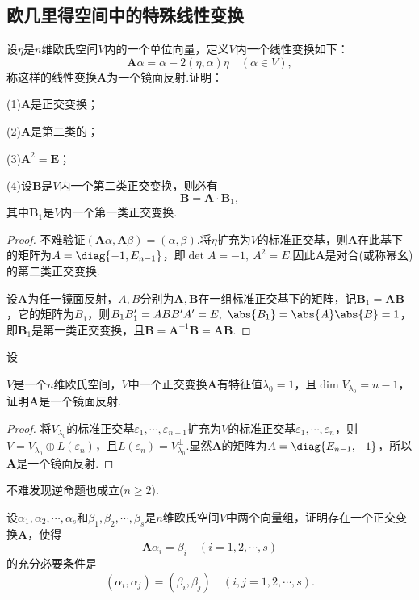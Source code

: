 \subsection{欧几里得空间中的特殊线性变换}
\begin{prob}[1]
	设$\eta$是$n$维欧氏空间$V$内的一个单位向量，定义$V$内一个线性变换如下：
	\[
		\bm A\alpha=\alpha-2(\eta,\alpha)\eta\quad(\alpha\in V),
	\]
	称这样的线性变换$\bm A$为一个{\heiti 镜面反射}.证明：

	(1)$\bm A$是正交变换；

	(2)$\bm A$是第二类的；

	(3)$\bm A^2=\bm E$；

	(4)设$\bm B$是$V$内一个第二类正交变换，则必有
	\[
		\bm B=\bm A\cdot \bm B_1,
	\]
	其中$\bm B_1$是$V$内一个第一类正交变换.
\end{prob}
\begin{proof}
	不难验证$(\bm A\alpha,\bm A\beta)=(\alpha,\beta)$.将$\eta$扩充为$V$的标准正交基，则$\bm A$在此基下的矩阵为$A=\diag{-1,E_{n-1}}$，即$\det A=-1,\ A^2=E$.因此$\bm A$是对合(或称幂幺)的第二类正交变换.

	设$\bm A$为任一镜面反射，$A,B$分别为$\bm A,\bm B$在一组标准正交基下的矩阵，记$\bm B_1=\bm A\bm B$，它的矩阵为$B_1$，则$B_1B_1'=ABB'A'=E,\ \abs{B_1}=\abs{A}\abs{B}=1$，即$\bm B_1$是第一类正交变换，且$\bm B=\bm A^{-1}\bm B=\bm A\bm B$.
\end{proof}
\begin{prob}[2]
	\hypertarget{Reflection}{设}$V$是一个$n$维欧氏空间，$V$中一个正交变换$\bm A$有特征值$\lambda_0=1$，且$\dim V_{\lambda_0}=n-1$，证明$\bm A$是一个镜面反射.
\end{prob}
\begin{proof}
	将$V_{\lambda_0}$的标准正交基$\varepsilon_1,\cdots,\varepsilon_{n-1}$扩充为$V$的标准正交基$\varepsilon_1,\cdots,\varepsilon_n$，则$V=V_{\lambda_0}\oplus L(\varepsilon_n)$，且$L(\varepsilon_n)=V_{\lambda_0}^\perp$.显然$\bm A$的矩阵为$A=\diag{E_{n-1},-1}$，所以$\bm A$是一个镜面反射.
\end{proof}
\begin{note}
	不难发现逆命题也成立($n\ge 2$).
\end{note}
\begin{prob}[3]
	设$\alpha_1,\alpha_2,\cdots,\alpha_s$和$\beta_1,\beta_2,\cdots,\beta_s$是$n$维欧氏空间$V$中两个向量组，证明存在一个正交变换$\bm A$，使得
	\[
		\bm A\alpha_i=\beta_i\quad(i=1,2,\cdots,s)
	\]
	的充分必要条件是
	\[
		(\alpha_i,\alpha_j)=(\beta_i,\beta_j)\quad(i,j=1,2,\cdots,s).
	\]
\end{prob}
